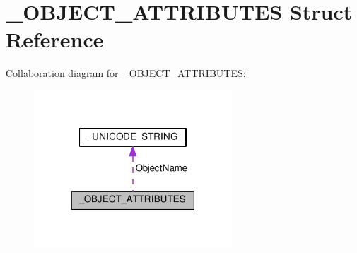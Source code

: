 \hypertarget{struct__OBJECT__ATTRIBUTES}{}\section{\+\_\+\+O\+B\+J\+E\+C\+T\+\_\+\+A\+T\+T\+R\+I\+B\+U\+T\+E\+S Struct Reference}
\label{struct__OBJECT__ATTRIBUTES}


Collaboration diagram for \+\_\+\+O\+B\+J\+E\+C\+T\+\_\+\+A\+T\+T\+R\+I\+B\+U\+T\+E\+S\+:
\nopagebreak
\begin{figure}[H]
\begin{center}
\leavevmode
\includegraphics[width=210pt]{struct__OBJECT__ATTRIBUTES__coll__graph}
\end{center}
\end{figure}
